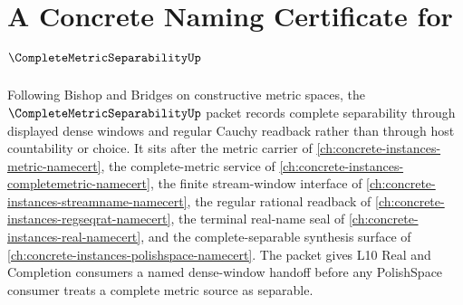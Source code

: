 \chapter{A Concrete Naming Certificate for $\CompleteMetricSeparabilityUp$}
\label{ch:concrete-instances-complete-metric-separability-namecert}

Following Bishop and Bridges on constructive metric spaces, the $\CompleteMetricSeparabilityUp$ packet records complete separability through displayed dense windows and regular Cauchy readback rather than through host countability or choice. It sits after the metric carrier of \autoref{ch:concrete-instances-metric-namecert}, the complete-metric service of \autoref{ch:concrete-instances-completemetric-namecert}, the finite stream-window interface of \autoref{ch:concrete-instances-streamname-namecert}, the regular rational readback of \autoref{ch:concrete-instances-regseqrat-namecert}, the terminal real-name seal of \autoref{ch:concrete-instances-real-namecert}, and the complete-separable synthesis surface of \autoref{ch:concrete-instances-polishspace-namecert}. The packet gives L10 Real and Completion consumers a named dense-window handoff before any PolishSpace consumer treats a complete metric source as separable.

